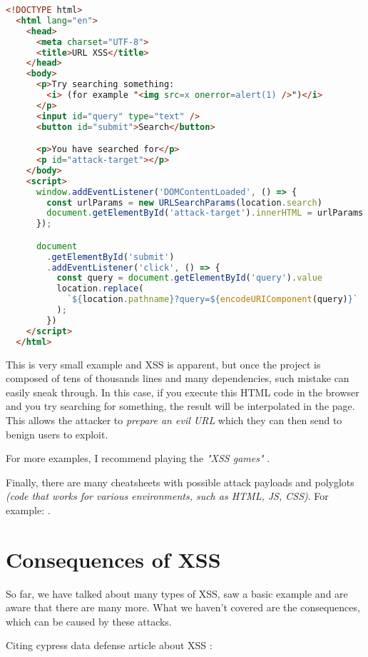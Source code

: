 \begin{lstlisting}[language=HTML]
  <!DOCTYPE html>
  <html lang="en">
    <head>
      <meta charset="UTF-8">
      <title>URL XSS</title>
    </head>
    <body>
      <p>Try searching something:
        <i> (for example "<img src=x onerror=alert(1) />")</i>
      </p>
      <input id="query" type="text" />
      <button id="submit">Search</button>

      <p>You have searched for</p>
      <p id="attack-target"></p>
    </body>
    <script>
      window.addEventListener('DOMContentLoaded', () => {
        const urlParams = new URLSearchParams(location.search)
        document.getElementById('attack-target').innerHTML = urlParams.get('query')
      });

      document
        .getElementById('submit')
        .addEventListener('click', () => {
          const query = document.getElementById('query').value
          location.replace(
            `${location.pathname}?query=${encodeURIComponent(query)}`
          );
        })
    </script>
  </html>
\end{lstlisting}

This is very small example and XSS is apparent, but once the project is composed of tens of
thousands lines and many dependencies, such mistake can easily sneak through. In this case, if you
execute this HTML code in the browser and you try searching for something, the result will be
interpolated in the page. This allows the attacker to \emph{prepare an evil URL} which they can then
send to benign users to exploit.

For more examples, I recommend playing the \emph{"XSS games"} \cite{xss_game_1} \cite{xss_game_2}
\cite{xss_game_3} \cite{xss_game_4}.

Finally, there are many cheatsheets with possible attack payloads and polyglots \emph{(code that
  works for various environments, such as HTML, JS, CSS)}. For example:
\cite{xss_attack_cheatsheet}.

\section{Consequences of XSS}

So far, we have talked about many types of XSS, saw a basic example and are aware that there are
many more. What we haven't covered are the consequences, which can be caused by these attacks.

Citing cypress data defense article about XSS \cite{cypress_xss_consequences}:


